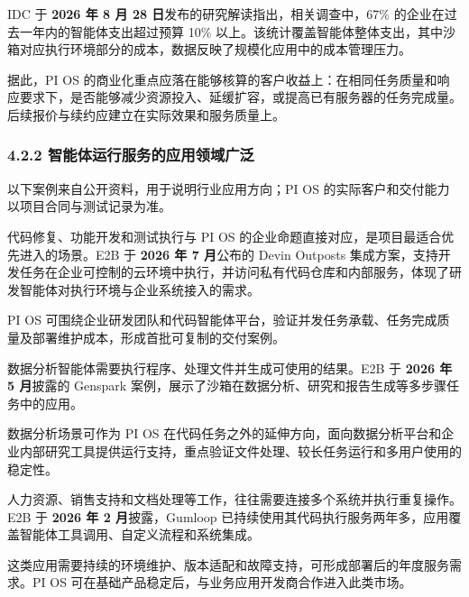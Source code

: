 
IDC 于 \textbf{2026 年 8 月 28 日}发布的研究解读指出，相关调查中，67\% 的企业在过去一年内的智能体支出超过预算 10\% 以上。该统计覆盖智能体整体支出，其中沙箱对应执行环境部分的成本，数据反映了规模化应用中的成本管理压力。

据此，PI OS 的商业化重点应落在能够核算的客户收益上：在相同任务质量和响应要求下，是否能够减少资源投入、延缓扩容，或提高已有服务器的任务完成量。后续报价与续约应建立在实际效果和服务质量上。

\subsubsection{4.2.2 智能体运行服务的应用领域广泛}\label{ux667aux80fdux4f53ux8fd0ux884cux670dux52a1ux7684ux5e94ux7528ux9886ux57dfux5e7fux6cdb}

以下案例来自公开资料，用于说明行业应用方向；PI OS 的实际客户和交付能力以项目合同与测试记录为准。


代码修复、功能开发和测试执行与 PI OS 的企业命题直接对应，是项目最适合优先进入的场景。E2B 于 \textbf{2026 年 7 月}公布的 Devin Outposts 集成方案，支持开发任务在企业可控制的云环境中执行，并访问私有代码仓库和内部服务，体现了研发智能体对执行环境与企业系统接入的需求。

PI OS 可围绕企业研发团队和代码智能体平台，验证并发任务承载、任务完成质量及部署维护成本，形成首批可复制的交付案例。


数据分析智能体需要执行程序、处理文件并生成可使用的结果。E2B 于 \textbf{2026 年 5 月}披露的 Genspark 案例，展示了沙箱在数据分析、研究和报告生成等多步骤任务中的应用。

数据分析场景可作为 PI OS 在代码任务之外的延伸方向，面向数据分析平台和企业内部研究工具提供运行支持，重点验证文件处理、较长任务运行和多用户使用的稳定性。


人力资源、销售支持和文档处理等工作，往往需要连接多个系统并执行重复操作。E2B 于 \textbf{2026 年 2 月}披露，Gumloop 已持续使用其代码执行服务两年多，应用覆盖智能体工具调用、自定义流程和系统集成。

这类应用需要持续的环境维护、版本适配和故障支持，可形成部署后的年度服务需求。PI OS 可在基础产品稳定后，与业务应用开发商合作进入此类市场。


